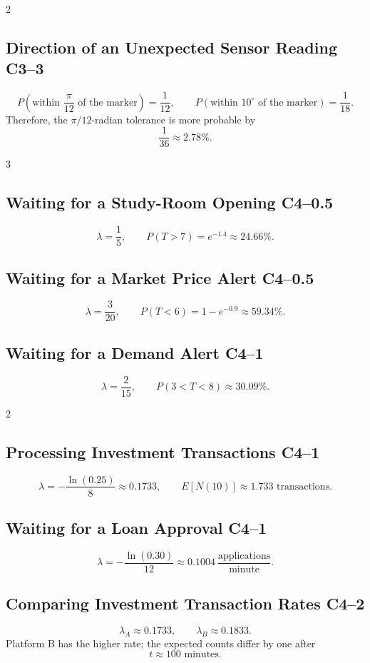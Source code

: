 {\begin{multicols}{2}
			\subsection{Direction of an Unexpected Sensor Reading \hfill C3--3}
			\[
			P\left(\text{within }\frac{\pi}{12}\text{ of the marker}\right)=\frac1{12},
			\qquad
			P\left(\text{within }10^\circ\text{ of the marker}\right)=\frac1{18}.
			\]
			Therefore, the \(\pi/12\)-radian tolerance is more probable by
			\[
			\boxed{\frac1{36}\approx2.78\%}.
			\]
		\end{multicols}

		\begin{multicols}{3}
			\subsection{Waiting for a Study-Room Opening \hfill C4--0.5}
			\[
			\lambda=\frac15,
			\qquad
			\boxed{P(T>7)=e^{-1.4}\approx24.66\%}.
			\]

			\subsection{Waiting for a Market Price Alert \hfill C4--0.5}
			\[
			\lambda=\frac3{20},
			\qquad
			\boxed{P(T<6)=1-e^{-0.9}\approx59.34\%}.
			\]

			\subsection{Waiting for a Demand Alert \hfill C4--1}
			\[
			\lambda=\frac2{15},
			\qquad
			\boxed{P(3<T<8)\approx30.09\%}.
			\]
		\end{multicols}

		\begin{multicols}{2}
			\subsection{Processing Investment Transactions \hfill C4--1}
			\[
			\lambda=-\frac{\ln(0.25)}8\approx0.1733,
			\qquad
			\boxed{E[N(10)]\approx1.733\text{ transactions}}.
			\]

			\subsection{Waiting for a Loan Approval \hfill C4--1}
			\[
			\boxed{\lambda=-\frac{\ln(0.30)}{12}
			\approx0.1004\ \frac{\text{applications}}{\text{minute}}}.
			\]

			\subsection{Comparing Investment Transaction Rates \hfill C4--2}
			\[
			\lambda_A\approx0.1733,
			\qquad
			\lambda_B\approx0.1833.
			\]
			Platform B has the higher rate; the expected counts differ by one after
			\[
			\boxed{t\approx100\text{ minutes}}.
			\]
		\end{multicols}
	}

	

